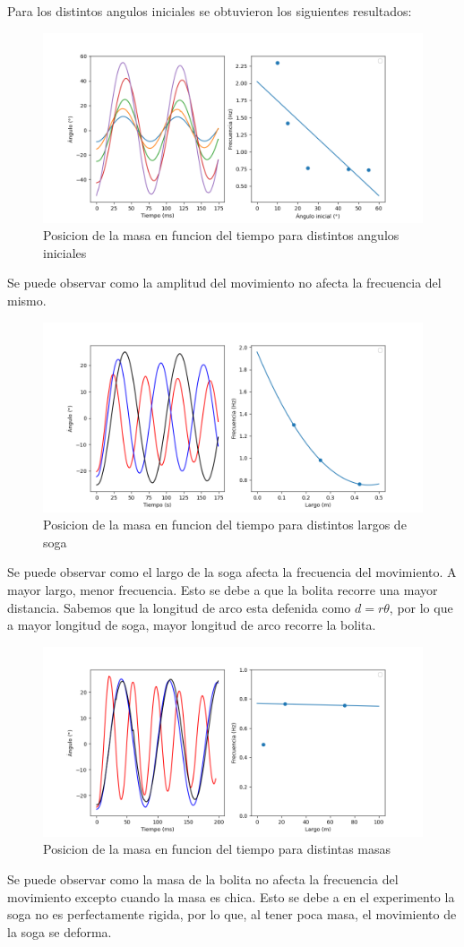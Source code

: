 \documentclass[12pt,a4]{article}
\begin{document}
Para los distintos angulos iniciales se obtuvieron los siguientes resultados:

\begin{figure}[H]
    \centering
    \includegraphics[width=0.6\linewidth]{angulos.png}
    \caption{Posicion de la masa en funcion del tiempo para distintos angulos iniciales}
    \label{fig:angulos}
\end{figure}

Se puede observar como la amplitud del movimiento no afecta la frecuencia del mismo. 

\begin{figure}[H]
    \centering
    \includegraphics[width=0.6\linewidth]{largo.png}
    \caption{Posicion de la masa en funcion del tiempo para distintos largos de soga}
    \label{fig:largo}
\end{figure}

Se puede observar como el largo de la soga afecta la frecuencia del movimiento. A mayor largo, menor frecuencia. Esto se debe a que la bolita recorre una mayor distancia. Sabemos que la longitud de arco esta defenida como $d = r \theta$, por lo que a mayor longitud de soga, mayor longitud de arco recorre la bolita.

\begin{figure}[H]
    \centering
    \includegraphics[width=0.6\linewidth]{peso.png}
    \caption{Posicion de la masa en funcion del tiempo para distintas masas}
    \label{fig:masa}
\end{figure}

Se puede observar como la masa de la bolita no afecta la frecuencia del movimiento excepto cuando la masa es chica. Esto se debe a en el experimento la soga no es perfectamente rigida, por lo que, al tener poca masa, el movimiento de la soga se deforma.
\end{document}
